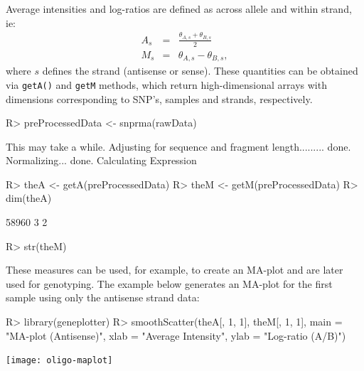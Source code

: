 \documentclass{article}
\newcommand{\Rmethod}[1]{{\texttt{#1}}}
\begin{document}
Average intensities and log-ratios are defined as across allele and
within strand, ie:
\begin{eqnarray}
  A_{s} & = & \frac{\theta_{A, s}+\theta_{B, s}}{2} \\
  M_{s} & = & \theta_{A, s} - \theta_{B, s},
\end{eqnarray}
where $s$ defines the strand (antisense or sense). These quantities
can be obtained via \Rmethod{getA()} and \Rmethod{getM} methods, which
return high-dimensional arrays with dimensions corresponding to SNP's,
samples and strands, respectively.
\begin{Schunk}
\begin{Sinput}
R> preProcessedData <- snprma(rawData)
\end{Sinput}
\begin{Soutput}
This may take a while.
Adjusting for sequence and fragment length......... done.
Normalizing... done.
Calculating Expression
\end{Soutput}
\begin{Sinput}
R> theA <- getA(preProcessedData)
R> theM <- getM(preProcessedData)
R> dim(theA)
\end{Sinput}
\begin{Soutput}
[1] 58960     3     2
\end{Soutput}
\begin{Sinput}
R> str(theM)
\end{Sinput}
\end{Schunk}

These measures can be used, for example, to create an MA-plot and are
later used for genotyping. The example below generates an MA-plot for
the first sample using only the antisense strand data:
\begin{Schunk}
\begin{Sinput}
R> library(geneplotter)
R> smoothScatter(theA[, 1, 1], theM[, 1, 1], main = "MA-plot (Antisense)", 
     xlab = "Average Intensity", ylab = "Log-ratio (A/B)")
\end{Sinput}
\end{Schunk}
\texttt{[image: oligo-maplot]}
\end{document}
